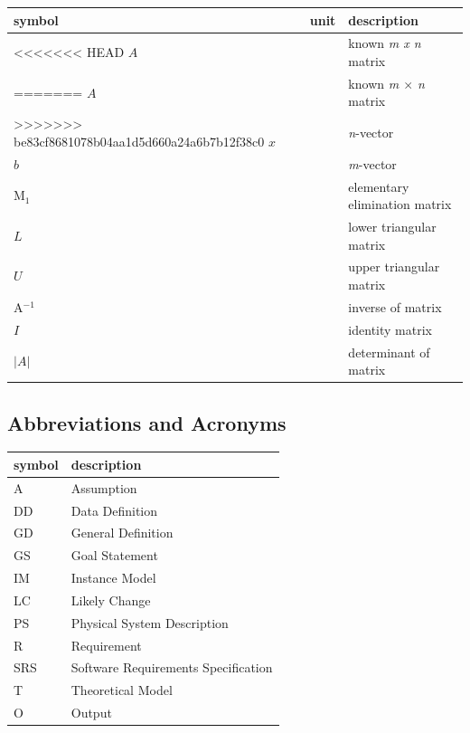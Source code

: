 \documentclass[12pt]{article}
\begin{document}
\renewcommand{\arraystretch}{1.2}
\noindent \begin{longtable*}{l l p{12cm}} \toprule
\textbf{symbol} & \textbf{unit} & \textbf{description}\\
\midrule


<<<<<<< HEAD
$A$ & \text{-} & known \textit{m x n} matrix \\
=======
$A$ & \text{-} & known \textit{m $\times$ n} matrix \\
>>>>>>> be83cf8681078b04aa1d5d660a24a6b7b12f38c0
$x$ & \text{-} & \textit{n}-vector\\
$b$ & \text{-} & \textit{m}-vector\\
M$_{1}$ & \text{-} & elementary elimination matrix\\
$L$ & \text{-} & lower triangular matrix\\
$U$ & \text{-} & upper triangular matrix\\ 
A$^{-1}$ & \text{-} & inverse of matrix \\
$I$ & \text{-} & identity matrix\\
{${|A|}$} & \text{-} & determinant of matrix\\ 

\bottomrule
\end{longtable*}


\subsection{Abbreviations and Acronyms}

\renewcommand{\arraystretch}{1.2}
\begin{tabular}{l l} 
  \toprule		
  \textbf{symbol} & \textbf{description}\\
  \midrule 
  A & Assumption\\
  DD & Data Definition\\
  GD & General Definition\\
  GS & Goal Statement\\
  IM & Instance Model\\
  LC & Likely Change\\
  PS & Physical System Description\\
  R & Requirement\\
  SRS & Software Requirements Specification\\

  T & Theoretical Model\\
  O & Output\\
  \bottomrule
\end{tabular}\\
\end{document}
